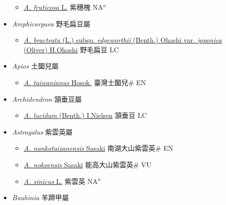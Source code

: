 \begin{itemize}
  \begin{itemize}
        \item[] \href{http://www.theplantlist.org/tpl1.1/search?q=Amorpha+fruticosa}{\textit{A. fruticosa} L.}   紫穗槐 NA$^n$
  \end{itemize}
 \item[] \textit{Amphicarpaea} 野毛扁豆屬
                    
  \begin{itemize}
        \item[] \href{http://www.theplantlist.org/tpl1.1/search?q=Amphicarpaea+bracteata+subsp.+edgeworthii+var.+japonica}{\textit{A. bracteata} (L.) subsp. \textit{edgeworthii} (Benth.) Ohashi var. \textit{japonica} (Oliver) H.Ohashi}   野毛扁豆 LC
  \end{itemize}
 \item[] \textit{Apios} 土圞兒屬
                    
  \begin{itemize}
        \item[] \href{http://www.theplantlist.org/tpl1.1/search?q=Apios+taiwanianus}{\textit{A. taiwanianus} Hosok.}   臺灣土圞兒\# EN
  \end{itemize}
 \item[] \textit{Archidendron} 頷垂豆屬
                    
  \begin{itemize}
        \item[] \href{http://www.theplantlist.org/tpl1.1/search?q=Archidendron+lucidum}{\textit{A. lucidum} (Benth.) I.Nielsen}   頷垂豆 LC
  \end{itemize}
 \item[] \textit{Astragalus} 紫雲英屬
                    
  \begin{itemize}
        \item[] \href{http://www.theplantlist.org/tpl1.1/search?q=Astragalus+nankotaizanensis}{\textit{A. nankotaizanensis} Sasaki}   南湖大山紫雲英\# EN
        \item[] \href{http://www.theplantlist.org/tpl1.1/search?q=Astragalus+nokoensis}{\textit{A. nokoensis} Sasaki}   能高大山紫雲英\# VU
        \item[] \href{http://www.theplantlist.org/tpl1.1/search?q=Astragalus+sinicus}{\textit{A. sinicus} L.}   紫雲英 NA$^n$
  \end{itemize}
 \item[] \textit{Bauhinia} 羊蹄甲屬
                    

\end{itemize}

